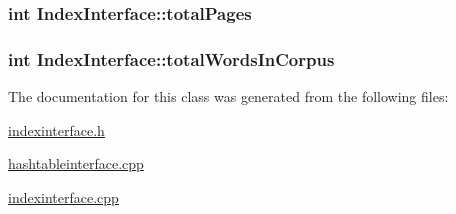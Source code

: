 \subsubsection[{total\+Pages}]{\setlength{\rightskip}{0pt plus 5cm}int Index\+Interface\+::total\+Pages\hspace{0.3cm}{\ttfamily [protected]}}\label{class_index_interface_a2df695d2b504f2e53a0bfdd6bfee31da}
\hypertarget{class_index_interface_ab607b430e78528cdb8bb79ba4afa91d2}{}
\subsubsection[{total\+Words\+In\+Corpus}]{\setlength{\rightskip}{0pt plus 5cm}int Index\+Interface\+::total\+Words\+In\+Corpus\hspace{0.3cm}{\ttfamily [protected]}}\label{class_index_interface_ab607b430e78528cdb8bb79ba4afa91d2}


The documentation for this class was generated from the following files\+:\begin{DoxyCompactItemize}
\item 
\hyperlink{indexinterface_8h}{indexinterface.\+h}\item 
\hyperlink{hashtableinterface_8cpp}{hashtableinterface.\+cpp}\item 
\hyperlink{indexinterface_8cpp}{indexinterface.\+cpp}\end{DoxyCompactItemize}
